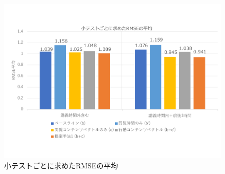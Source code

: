 \documentclass[a4paper,12pt]{ltjsreport}
\begin{document}
\begin{figure}[tbp]
  \centering
  \includegraphics[scale = 0.4]{RMSE_5.pdf}
  \vspace{-10mm}
  \caption{小テストごとに求めたRMSEの平均}
  \label{fig:rmse}
\end{figure}


\end{document}
